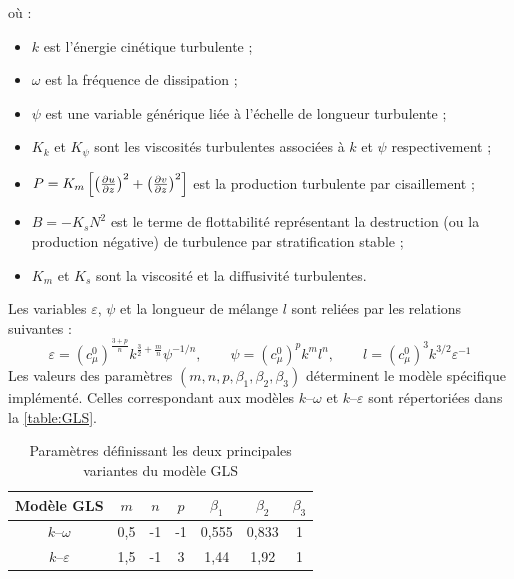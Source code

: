 où :
\begin{itemize}
	\item $k$ est l’énergie cinétique turbulente ;
	\item $\omega$ est la fréquence de dissipation ;
	\item $\psi$ est une variable générique liée à l’échelle de longueur turbulente ;
	\item $K_k$ et $K_\psi$ sont les viscosités turbulentes associées à $k$ et $\psi$ respectivement ;
	\item $P = K_m \left[ \left( \frac{\partial u}{\partial z} \right)^2 + \left( \frac{\partial v}{\partial z} \right)^2 \right]$ est la production turbulente par cisaillement ;
	\item $B = -K_s N^2$ est le terme de flottabilité représentant la destruction (ou la production négative) de turbulence par stratification stable ;
	\item $K_m$ et $K_s$ sont la viscosité et la diffusivité turbulentes.
\end{itemize}

 Les variables $\varepsilon$, $\psi$ et la longueur de mélange $l$ sont reliées par les relations suivantes :
\begin{equation}
\varepsilon = \left(c^0_\mu\right)^{\frac{3+p}{n}} k^{\frac{3}{2}+\frac{m}{n}} \psi^{-1/n}, \qquad
\psi = \left(c^0_\mu\right)^p k^m l^n, \qquad
l = \left(c^0_\mu\right)^3 k^{3/2} \varepsilon^{-1}
\end{equation}
Les valeurs des paramètres $(m, n, p, \beta_1, \beta_2, \beta_3)$ déterminent le modèle spécifique implémenté. Celles correspondant aux modèles $k$–$\omega$ et $k$–$\varepsilon$ sont répertoriées dans la \autoref{table:GLS}.
\begin{table}[ht]
\centering
\begin{tabular}{|c|c|c|c|c|c|c|}
\hline
\textbf{Modèle GLS} & $m$ & $n$ & $p$ & $\beta_1$ & $\beta_2$ & $\beta_3$ \\
\hline
$k$–$\omega$ & 0,5 & -1 & -1 & 0,555 & 0,833 & 1  \\
\hline
$k$–$\varepsilon$ & 1,5 & -1 & 3 & 1,44 & 1,92 & 1 \\
\hline
\end{tabular}
\caption{Paramètres définissant les deux principales variantes du modèle GLS}
\label{table:GLS}
\end{table}

